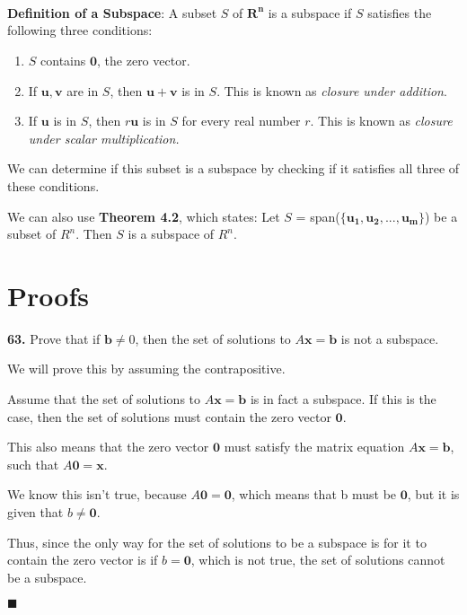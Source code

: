 \documentclass[12pt]{article}
\title{
    \vspace{2in}
    \textmd{\textbf{\hmwkTitle}}\\
    \large\vspace{0.1in}{\hmwkClass}\\
    \large\vspace{0.1in}{\textbf{Date: }\hmwkDueDate}\\
    \vspace{0.1in}{\textbf{Professor: }\hmwkClassInstructor}
    \vspace{1in}
}
\author{\hmwkAuthorName}
\date{}
\renewcommand{\vec}[1]{\mathbf{#1}}
\begin{document}
\begin{elaboration}

\textbf{Definition of a Subspace}:
A subset $S$ of $\vec{R^n}$ is a subspace if $S$ satisfies the following three conditions:

\begin{enumerate}[label=(\roman{enumi})]
\item $S$ contains $\vec{0}$, the zero vector.
\item If $\vec{u}, \vec{v}$ are in $S$, then $\vec{u + v}$ is in $S$. This is known as \emph{closure under addition}.
\item If $\vec{u}$ is in $S$, then $r\vec{u}$ is in $S$ for every real number $r$. This is known as \emph{closure under scalar multiplication.}
\end{enumerate}


We can determine if this subset is a subspace by checking if it satisfies all three of these conditions. 

We can also use \textbf{Theorem 4.2}, which states: Let $S$ = span($\{\vec{u_1}, \vec{u_2},..., \vec{u_m} \}$) be a subset of $R^n$. Then $S$ is a subspace of $R^n$.

\end{elaboration}

\pagebreak
\section*{Proofs}

\textbf{63.} Prove that if $\vec{b} \neq 0$, then the set of solutions to $A\vec{x} = \vec{b}$ is not a subspace.

\begin{lin-proof}
We will prove this by assuming the contrapositive.

Assume that the set of solutions to $A\vec{x} = \vec{b}$ is in fact a subspace. If this is the case, then the set of solutions must contain the zero vector $\vec{0}$. 

This also means that the zero vector $\vec{0}$ must satisfy the matrix equation $A\vec{x} = \vec{b}$, such that $A\vec{0} = \vec{x}$.

 We know this isn't true, because $A\vec{0} = \vec{0}$, which means that b must be $\vec{0}$, but it is given that $b \neq \vec{0}$. 
 
Thus, since the only way for the set of solutions to be a subspace is for it to contain the zero vector is if $b = \vec{0}$, which is not true, the set of solutions cannot be a subspace. 


 \begin{flushright}$\blacksquare$ \end{flushright}
\end{lin-proof}
\end{document}
